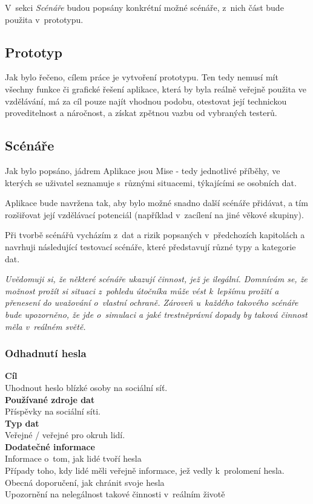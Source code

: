 V~sekci \textit{Scénáře} budou popsány konkrétní možné scénáře, z~nich část bude použita v~prototypu.

\subsection{Prototyp}
Jak bylo řečeno, cílem práce je vytvoření prototypu. Ten tedy nemusí mít všechny funkce či grafické řešení aplikace, která by byla reálně veřejně použita ve vzdělávání, má za cíl pouze najít vhodnou podobu, otestovat její technickou proveditelnost a náročnost, a získat zpětnou vazbu od vybraných testerů.


\subsection{Scénáře}
Jak bylo popsáno, jádrem Aplikace jsou Mise - tedy jednotlivé příběhy, ve kterých se uživatel seznamuje s~různými situacemi, týkajícími se osobních dat.

Aplikace bude navržena tak, aby bylo možné snadno další scénáře přidávat, a tím rozšiřovat její vzdělávací potenciál (například v~zacílení na jiné věkové skupiny).

Při tvorbě scénářů vycházím z~dat a rizik popsaných v~předchozích kapitolách a navrhuji následující testovací scénáře, které představují různé typy a kategorie dat.

\textit{Uvědomuji si, že některé scénáře ukazují činnost, jež je ilegální. Domnívám se, že možnost prožít si situaci z~pohledu útočníka může vést k~lepšímu prožití a přenesení do uvažování o~vlastní ochraně. Zároveň u~každého takového scénáře bude upozorněno, že jde o~simulaci a jaké trestněprávní dopady by taková činnost měla v~reálném světě.}

\subsubsection*{Odhadnutí hesla}
\textbf{Cíl}\\
Uhodnout heslo blízké osoby na sociální síť.\\
\textbf{Používané zdroje dat}\\
Příspěvky na sociální síti.\\
\textbf{Typ dat}\\
Veřejné / veřejné pro okruh lidí.\\
\textbf{Dodatečné informace}\\
Informace o~tom, jak lidé tvoří hesla\\
Případy toho, kdy lidé měli veřejně informace, jež vedly k~prolomení hesla.\\
Obecná doporučení, jak chránit svoje hesla\\
Upozornění na nelegálnost takové činnosti v~reálním životě\\

